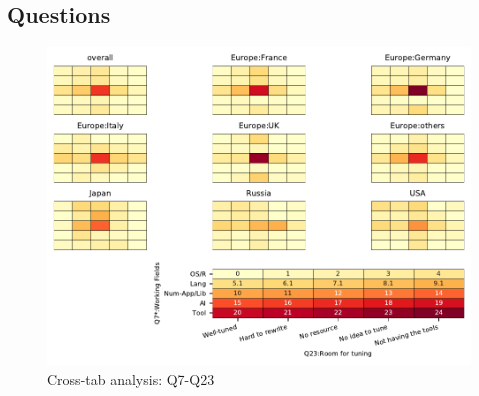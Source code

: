 
\subsection{Questions}


\begin{figure}
\begin{center}
\includegraphics[width=12cm]{../pdfs/Q7-Q23.pdf}
\caption{Cross-tab analysis: Q7-Q23}
\label{fig:Q7-Q23}
\end{center}
\end{figure}
